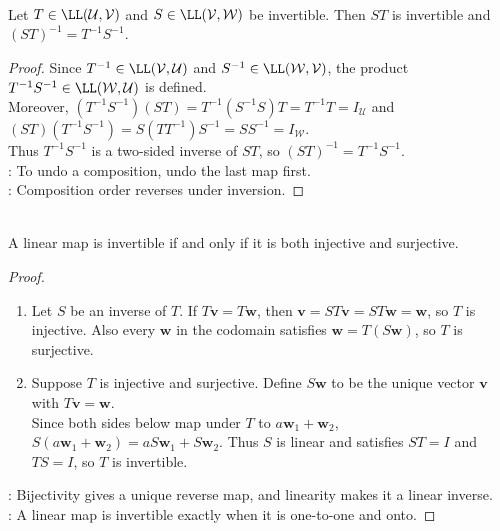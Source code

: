 \begin{proposition} \label{prop:inverse-of-product-linear-maps} \\
Let $T\in\LL(\mathcal{U},\mathcal{V})$ and $S\in\LL(\mathcal{V},\mathcal{W})$ be invertible. Then $ST$ is invertible and $(ST)^{-1}=T^{-1}S^{-1}$.
\begin{proof}
Since $T^{-1}\in\LL(\mathcal{V},\mathcal{U})$ and $S^{-1}\in\LL(\mathcal{W},\mathcal{V})$, the product $T^{-1}S^{-1}\in\LL(\mathcal{W},\mathcal{U})$ is defined.\\
Moreover, $(T^{-1}S^{-1})(ST)=T^{-1}(S^{-1}S)T=T^{-1}T=I_{\mathcal{U}}$ and $(ST)(T^{-1}S^{-1})=S(TT^{-1})S^{-1}=SS^{-1}=I_{\mathcal{W}}$.\\
Thus $T^{-1}S^{-1}$ is a two-sided inverse of $ST$, so $(ST)^{-1}=T^{-1}S^{-1}$.\\
: To undo a composition, undo the last map first.\\
: Composition order reverses under inversion.
\end{proof}
\end{proposition}

\begin{proposition} \label{prop:linear-map-invertible-iff-bijective} \\
A linear map is invertible if and only if it is both injective and surjective.
\begin{proof}
\begin{enumerate}[label=\roman*.]
\setlength{\itemsep}{0pt}
\item[$(\Rightarrow)$] Let $S$ be an inverse of $T$. If $T\mathbf{v}=T\mathbf{w}$, then $\mathbf{v}=ST\mathbf{v}=ST\mathbf{w}=\mathbf{w}$, so $T$ is injective. Also every $\mathbf{w}$ in the codomain satisfies $\mathbf{w}=T(S\mathbf{w})$, so $T$ is surjective.
\item[$(\Leftarrow)$] Suppose $T$ is injective and surjective. Define $S\mathbf{w}$ to be the unique vector $\mathbf{v}$ with $T\mathbf{v}=\mathbf{w}$.\\
Since both sides below map under $T$ to $a\mathbf{w}_1+\mathbf{w}_2$, $S(a\mathbf{w}_1+\mathbf{w}_2)=aS\mathbf{w}_1+S\mathbf{w}_2$. Thus $S$ is linear and satisfies $ST=I$ and $TS=I$, so $T$ is invertible.
\end{enumerate}
: Bijectivity gives a unique reverse map, and linearity makes it a linear inverse.\\
: A linear map is invertible exactly when it is one-to-one and onto.
\end{proof}
\end{proposition}

